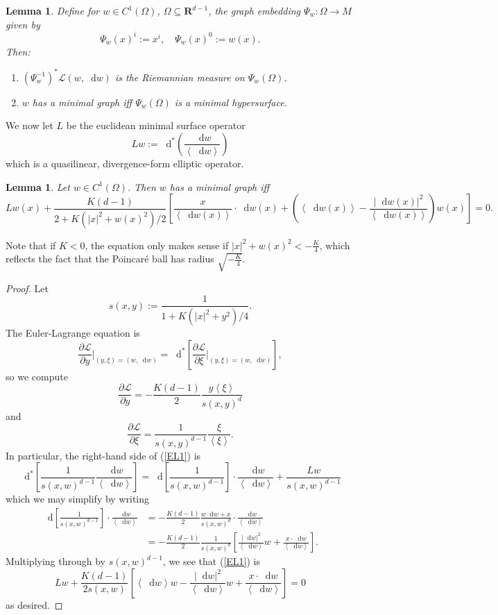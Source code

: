 \documentclass[reqno,11pt]{amsart}
\newcommand{\RR}{\mathbf{R}}
\newcommand*\dif{\mathop{}\!\mathrm{d}}
\newcommand{\Lagrange}{\mathcal L}
\def\Japan#1{\left \langle #1 \right \rangle}
\newtheorem{lemma}[theorem]{Lemma}
\theoremstyle{definition}
\numberwithin{equation}{section}
\begin{document}
\begin{lemma}\label{Plateau setup lemma}
Define for $w \in C^1(\Omega)$, $\Omega \subseteq \RR^{d - 1}$, the graph embedding $\Psi_w: \Omega \to M$ given by
$$\Psi_w(x)^i := x^i, \quad \Psi_w(x)^0 := w(x).$$
Then:
\begin{enumerate}
\item $(\Psi_w^{-1})^* \Lagrange(w, \dif w)$ is the Riemannian measure on $\Psi_w(\Omega)$.
\item $w$ has a minimal graph iff $\Psi_w(\Omega)$ is a minimal hypersurface.
\end{enumerate}
\end{lemma}

We now let $L$ be the euclidean minimal surface operator
$$Lw := \dif^* \left(\frac{\dif w}{\Japan{\dif w}}\right)$$
which is a quasilinear, divergence-form elliptic operator.

\begin{lemma}
Let $w \in C^1(\Omega)$. Then $w$ has a minimal graph iff
\begin{equation}\label{EL}
	Lw(x) + \frac{K(d - 1)}{2 + K(|x|^2 + w(x)^2)/2} \left[\frac{x}{\Japan{\dif w(x)}} \cdot \dif w(x) + \left(\Japan{\dif w(x)} - \frac{|\dif w(x)|^2}{\Japan{\dif w(x)}}\right) w(x)\right] = 0.
\end{equation}
\end{lemma}

Note that if $K < 0$, the equation only makes sense if $|x|^2 + w(x)^2 < -\frac{K}{4}$, which reflects the fact that the Poincar\'e ball has radius $\sqrt{-\frac{K}{4}}$.

\begin{proof}
Let 
$$s(x, y) := \frac{1}{1 + K(|x|^2 + y^2)/4}.$$
The Euler-Lagrange equation is 
\begin{equation}\label{EL1}
\frac{\partial \Lagrange}{\partial y}\bigg|_{(y, \xi) = (w, \dif w)} = \dif^*\left[\frac{\partial \Lagrange}{\partial \xi}\bigg|_{(y, \xi) = (w, \dif w)}\right],
\end{equation}
so we compute
$$\frac{\partial \Lagrange}{\partial y} = -\frac{K(d - 1)}{2} \frac{y\Japan \xi}{s(x, y)^d}$$
and 
$$\frac{\partial \Lagrange}{\partial \xi} = \frac{1}{s(x, y)^{d - 1}} \frac{\xi}{\Japan \xi}.$$
In particular, the right-hand side of (\ref{EL1}) is 
$$\dif^* \left[\frac{1}{s(x, w)^{d - 1}} \frac{\dif w}{\Japan{\dif w}}\right] = \dif \left[\frac{1}{s(x, w)^{d - 1}}\right] \cdot \frac{\dif w}{\Japan{\dif w}} + \frac{Lw}{s(x, w)^{d - 1}}$$
which we may simplify by writing
\begin{align*}
\dif \left[\frac{1}{s(x, w)^{d - 1}}\right] \cdot \frac{\dif w}{\Japan{\dif w}} 
&= - \frac{K(d - 1)}{2} \frac{w \dif w + x}{s(x, w)^d} \cdot \frac{\dif w}{\Japan{\dif w}} \\
&= - \frac{K(d - 1)}{2} \frac{1}{s(x, w)^d} \left[\frac{|\dif w|^2}{\Japan{\dif w}} w + \frac{x \cdot \dif w}{\Japan{\dif w}}\right].
\end{align*}
Multiplying through by $s(x, w)^{d - 1}$, we see that (\ref{EL1}) is 
$$Lw + \frac{K(d - 1)}{2s(x, w)} \left[\Japan{\dif w} w - \frac{|\dif w|^2}{\Japan{\dif w}} w + \frac{x \cdot \dif w}{\Japan{\dif w}}\right] = 0$$
as desired.
\end{proof}
\end{document}
